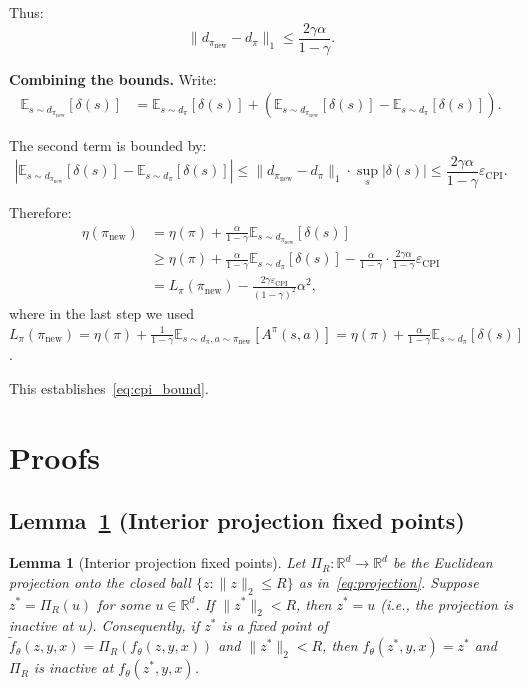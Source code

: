 \documentclass{article}
\theoremstyle{plain}
\newtheorem{lemma}[theorem]{Lemma}
\theoremstyle{definition}
\theoremstyle{remark}
\newcommand{\R}{\mathbb{R}}
\newcommand{\E}{\mathbb{E}}
\begin{document}
Thus:
\begin{equation}
\|d_{\pi_{\mathrm{new}}} - d_\pi\|_1 \le \frac{2\gamma\alpha}{1-\gamma}.
\end{equation}

\textbf{Combining the bounds.}
Write:
\begin{align}
\E_{s \sim d_{\pi_{\mathrm{new}}}}[\delta(s)] &= \E_{s \sim d_\pi}[\delta(s)] + \left(\E_{s \sim d_{\pi_{\mathrm{new}}}}[\delta(s)] - \E_{s \sim d_\pi}[\delta(s)]\right).
\end{align}

The second term is bounded by:
\begin{equation}
\left|\E_{s \sim d_{\pi_{\mathrm{new}}}}[\delta(s)] - \E_{s \sim d_\pi}[\delta(s)]\right| \le \|d_{\pi_{\mathrm{new}}} - d_\pi\|_1 \cdot \sup_s|\delta(s)| \le \frac{2\gamma\alpha}{1-\gamma} \varepsilon_{\mathrm{CPI}}.
\end{equation}

Therefore:
\begin{align}
\eta(\pi_{\mathrm{new}}) &= \eta(\pi) + \frac{\alpha}{1-\gamma} \E_{s \sim d_{\pi_{\mathrm{new}}}}[\delta(s)] \\
&\ge \eta(\pi) + \frac{\alpha}{1-\gamma} \E_{s \sim d_\pi}[\delta(s)] - \frac{\alpha}{1-\gamma} \cdot \frac{2\gamma\alpha}{1-\gamma} \varepsilon_{\mathrm{CPI}} \\
&= L_\pi(\pi_{\mathrm{new}}) - \frac{2\gamma\varepsilon_{\mathrm{CPI}}}{(1-\gamma)^2} \alpha^2,
\end{align}
where in the last step we used $L_\pi(\pi_{\mathrm{new}}) = \eta(\pi) + \frac{1}{1-\gamma}\E_{s \sim d_\pi, a \sim \pi_{\mathrm{new}}}[A^\pi(s,a)] = \eta(\pi) + \frac{\alpha}{1-\gamma}\E_{s \sim d_\pi}[\delta(s)]$.

This establishes~\eqref{eq:cpi_bound}.

\section{Proofs}
\label{app:proofs}

\subsection{Lemma~\ref{lem:interior_proj} (Interior projection fixed points)}

\begin{lemma}[Interior projection fixed points]
\label{lem:interior_proj}
Let $\Pi_R:\R^d\to\R^d$ be the Euclidean projection onto the closed ball $\{z:\|z\|_2\le R\}$ as in~\eqref{eq:projection}.
Suppose $z^*=\Pi_R(u)$ for some $u\in\R^d$.
If $\|z^*\|_2 < R$, then $z^* = u$ (i.e., the projection is inactive at $u$).
Consequently, if $z^*$ is a fixed point of $\tilde f_\theta(z,y,x)=\Pi_R(f_\theta(z,y,x))$ and $\|z^*\|_2 < R$, then $f_\theta(z^*,y,x)=z^*$ and $\Pi_R$ is inactive at $f_\theta(z^*,y,x)$.
\end{lemma}
\end{document}
